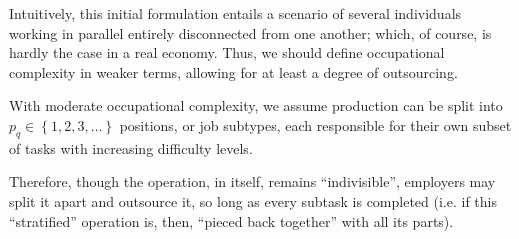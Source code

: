 \documentclass[hidelinks, nonatbib]{elsarticle}
\begin{document}
\begin{axiom}
\begin{subaxiom}
        Intuitively, this initial formulation entails a scenario of several individuals working in parallel entirely disconnected from one another; which, of course, is hardly the case in a real economy. Thus, we should define occupational complexity in weaker terms, allowing for at least a degree of outsourcing.
    \end{subaxiom}

    \begin{subaxiom} With moderate occupational complexity, we assume production can be split into $p_q \in \left\{1, 2, 3, \dots\right\}$ positions, or job subtypes, each responsible for their own subset of tasks with increasing difficulty levels.
    
    Therefore, though the operation, in itself, remains ``indivisible'', employers may split it apart and outsource it, so long as every subtask is completed (i.e. if this ``stratified'' operation is, then, ``pieced back together'' with all its parts).


\end{subaxiom}
\end{axiom}
\end{document}
